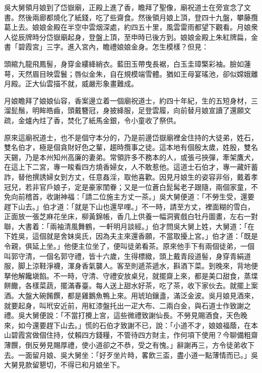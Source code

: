 吳大舅領月娘到了岱嶽廟，正殿上進了香，瞻拜了聖像，廟祝道士在旁宣念了文書。然後兩廊都燒化了紙錢，吃了些齋食。然後領月娘上頂，登四十九盤，攀藤攬葛上去。娘娘金殿在半空中雲烟深處，約四五十里，風雲雷雨都望下觀看。{}月娘衆人從辰牌時分岱嶽廟起身，登盤上頂，至申時已後方到。娘娘金殿上朱紅牌扁，金書「碧霞宮」三字。進入宮內，瞻禮娘娘金身。怎生模樣？但見：

\begin{myquote}
頭綰九龍飛鳳髻，身穿金縷絳綃衣。藍田玉帶曳長裾，白玉圭璋檠彩袖。臉如蓮萼，天然眉目映雲鬟；唇似金朱，自在規模端雪體。猶如王母宴瑤池，卻似嫦娥離月殿。正大仙雲描不就，威嚴形象畫難成。
\end{myquote}

月娘瞻拜了娘娘仙容，香案邊立着一個廟祝道士，約四十年紀，生的五短身材，三溜髭鬚，明眸皓齒，頭戴簪冠，身披絳服，足登雲履，向前替月娘宣讀了還願文疏，金爐內炷了香，焚化了紙馬金銀，令小童收了祭供。

原來這廟祝道士，也不是個守本分的，乃是前邊岱嶽廟裡金住持的大徒弟，姓石，雙名伯才，極是個貪財好色之輩，趨時攬事之徒。這本地有個殷太歲，姓殷，雙名天錫，乃是本州知州高廉的妻弟。常領許多不務本的人，或張弓挾彈，牽架鷹犬，在這上下二宮，專一睃看四方燒香婦女，{}人不敢惹他。這道士石伯才，專一藏奸蓄詐，替他撰誘婦女到方丈，任意姦淫，取他喜歡。因見月娘生的姿容非俗，戴着孝冠兒，若非官戶娘子，定是豪家閨眷；又是一位蒼白髭髯老子跟隨，兩個家童，{}不免向前稽首，收謝神福：「請二位施主方丈一茶。」吳大舅便道：「不勞生受，還要趕下山去。」伯才道：「就是下山也還早哩。」{}不一時，請至方丈，裡面糊的雪白，正面放一張芝麻花坐床，柳黃錦帳，香几上供養一幅洞賓戲白牡丹圖畫，{}左右一對聯，大書着：「兩袖清風舞鶴，一軒明月談經。」伯才問吳大舅上姓，大舅道：「在下姓吳，這個就是舍妹吳氏，因為夫主來還香願，不當取擾上宮。」伯才道：「既是令親，俱延上坐。」他便主位坐了，便叫徒弟看茶。原來他手下有兩個徒弟，一個叫郭守清，一個名郭守禮，皆十六歲，生得標緻，頭上戴青段道髻，身穿青絹道服，脚上涼鞋淨襪，渾身香氣襲人。{}客至則遞茶遞水，斟酒下菜。到晚來，背地便拏他解饞塡餡。不一時，守清、守禮安放桌兒，就擺齋上來，都是美口甜食，蒸堞餅饊，各樣菜蔬，擺滿春臺。每人送上甜水好茶，吃了茶，收下家伙去。就擺上案酒。大盤大碗餚饌，都是雞鵝魚鴨上來。用琥珀鑲盞，滿泛金波。吳月娘見酒來，就要起身，叫玳安近前，用紅漆盤托出一疋大布、二兩白金，與石道士作致謝之禮。吳大舅便說：「不當打攪上宮，這些微禮致謝仙長。不勞見賜酒食，天色晚來，如今還要趕下山去。」慌的石伯才致謝不已，說：「小道不才，娘娘福蔭，在本山碧霞宮做個住持，仗賴四方錢糧，不管待四方財主，作何項下使用？今聊備粗齋薄饌，倒反勞見賜厚禮，使小道卻之不恭，受之有愧。」辭謝再三，方令徒弟收下去。一面留月娘、吳大舅坐：「好歹坐片時，畧飲三盃，盡小道一點薄情而已。」吳大舅見款留懇切，不得已和月娘坐下。

